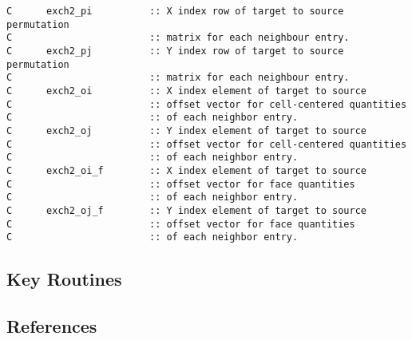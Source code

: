 {\footnotesize
\begin{verbatim}
C      exch2_pi          :: X index row of target to source permutation 
C                        :: matrix for each neighbour entry.            
C      exch2_pj          :: Y index row of target to source permutation 
C                        :: matrix for each neighbour entry.            
C      exch2_oi          :: X index element of target to source 
C                        :: offset vector for cell-centered quantities  
C                        :: of each neighbor entry.                     
C      exch2_oj          :: Y index element of target to source 
C                        :: offset vector for cell-centered quantities  
C                        :: of each neighbor entry.                     
C      exch2_oi_f        :: X index element of target to source 
C                        :: offset vector for face quantities           
C                        :: of each neighbor entry.                     
C      exch2_oj_f        :: Y index element of target to source 
C                        :: offset vector for face quantities           
C                        :: of each neighbor entry.                     
\end{verbatim}
}



\subsection{Key Routines}



\subsection{References}
